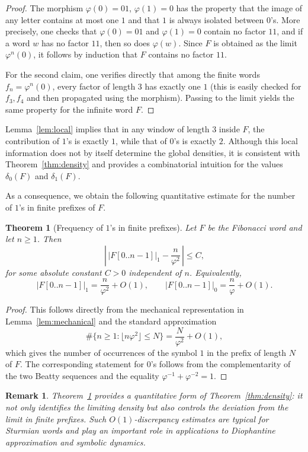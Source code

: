 \documentclass[12pt, a4paper]{article}
\newtheorem{theorem}{Theorem}[section]
\newtheorem{remark}{Remark}
\begin{document}
\begin{proof}
The morphism $\varphi(0) = 01$, $\varphi(1) = 0$ has the property that the image of any letter contains at most one $1$ and that $1$ is always isolated between $0$'s. More precisely, one checks that $\varphi(0) = 01$ and $\varphi(1) = 0$ contain no factor $11$, and if a word $w$ has no factor $11$, then so does $\varphi(w)$. Since $F$ is obtained as the limit $\varphi^n(0)$, it follows by induction that $F$ contains no factor $11$.

For the second claim, one verifies directly that among the finite words $f_n = \varphi^n(0)$, every factor of length $3$ has exactly one $1$ (this is easily checked for $f_3, f_4$ and then propagated using the morphism). Passing to the limit yields the same property for the infinite word $F$.
\end{proof}

Lemma~\ref{lem:local} implies that in any window of length $3$ inside $F$, the contribution of $1$'s is exactly $1$, while that of $0$'s is exactly $2$. Although this local information does not by itself determine the global densities, it is consistent with Theorem~\ref{thm:density} and provides a combinatorial intuition for the values $\delta_0(F)$ and $\delta_1(F)$.

As a consequence, we obtain the following quantitative estimate for the number of $1$'s in finite prefixes of $F$.

\begin{theorem}[Frequency of $1$'s in finite prefixes]\label{thm:prefix-density}
Let $F$ be the Fibonacci word and let $n \ge 1$. Then
\[
\left|\, |F[0..n-1]|_1 - \frac{n}{\varphi^2}\, \right| \le C,
\]
for some absolute constant $C > 0$ independent of $n$. Equivalently,
\[
|F[0..n-1]|_1 = \frac{n}{\varphi^2} + O(1),
\qquad
|F[0..n-1]|_0 = \frac{n}{\varphi} + O(1).
\]
\end{theorem}

\begin{proof}
This follows directly from the mechanical representation in Lemma~\ref{lem:mechanical} and the standard approximation
\[
\#\{n \ge 1 : \lfloor n\varphi^2 \rfloor \le N\}
= \frac{N}{\varphi^2} + O(1),
\]
which gives the number of occurrences of the symbol $1$ in the prefix of length $N$ of $F$. The corresponding statement for $0$'s follows from the complementarity of the two Beatty sequences and the equality $\varphi^{-1} + \varphi^{-2} = 1$.
\end{proof}

\begin{remark}
Theorem~\ref{thm:prefix-density} provides a quantitative form of Theorem~\ref{thm:density}: it not only identifies the limiting density but also controls the deviation from the limit in finite prefixes. Such $O(1)$-discrepancy estimates are typical for Sturmian words and play an important role in applications to Diophantine approximation and symbolic dynamics.
\end{remark}
\end{document}
